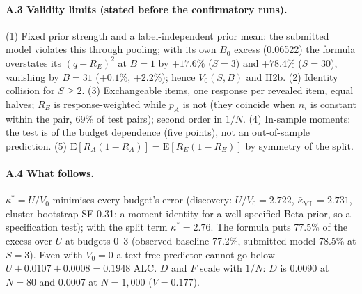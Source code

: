 \documentclass{article}
\begin{document}
\paragraph{A.3 Validity limits (stated before the confirmatory runs).} (1) Fixed prior strength and a label-independent
prior mean: the submitted model violates this through pooling; with its own $B_0$ excess (0.06522) the formula
overstates its $(q - R_E)^2$ at $B = 1$ by $+17.6\%$ ($S = 3$) and $+78.4\%$ ($S = 30$), vanishing by $B = 31$
($+0.1\%$, $+2.2\%$); hence $V_0(S, B)$ and H2b. (2) Identity collision for $S \ge 2$. (3) Exchangeable items, one
response per revealed item, equal halves; $R_E$ is response-weighted while $\bar p_A$ is not (they coincide when $n_i$ is
constant within the pair, 69\% of test pairs); second order in $1/N$. (4) In-sample moments: the test is of the budget
dependence (five points), not an out-of-sample prediction. (5) $\mathrm{E}[R_A(1-R_A)] = \mathrm{E}[R_E(1-R_E)]$ by
symmetry of the split.

\paragraph{A.4 What follows.} $\kappa^* = U/V_0$ minimises every budget's error (discovery: $U/V_0 = 2.722$,
$\bar\kappa_{\mathrm{ML}} = 2.731$, cluster-bootstrap SE 0.31; a moment identity for a well-specified Beta prior, so a
specification test); with the split term $\kappa^* = 2.76$. The formula puts 77.5\% of the excess over $U$ at budgets
0--3 (observed baseline 77.2\%, submitted model 78.5\% at $S = 3$). Even with $V_0 = 0$ a text-free predictor cannot go
below $U + 0.0107 + 0.0008 = 0.1948$ ALC. $D$ and $F$ scale with $1/N$: $D$ is 0.0090 at $N = 80$ and 0.0007 at $N =
1{,}000$ ($V = 0.177$).
\end{document}
